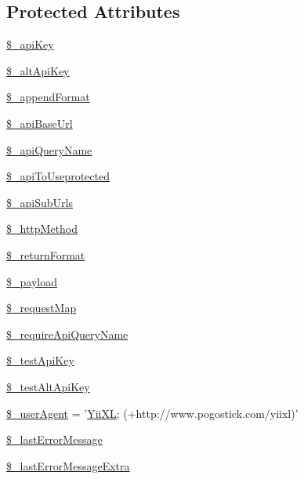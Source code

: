 \subsection*{Protected Attributes}
\begin{DoxyCompactItemize}
\item 
\hyperlink{classCXLApiComponent_a30d859488ed1921f08a7e8191363d9a4}{\$\_\-apiKey}
\item 
\hyperlink{classCXLApiComponent_a3bb30fd55481cc30ef96aa61d1b523b6}{\$\_\-altApiKey}
\item 
\hyperlink{classCXLApiComponent_ae027f791b6a2fc198dfabc3e2693f585}{\$\_\-appendFormat}
\item 
\hyperlink{classCXLApiComponent_a2a3098653897c46b33497dd90b807f64}{\$\_\-apiBaseUrl}
\item 
\hyperlink{classCXLApiComponent_adb92b727d9e245493a2001eca37693de}{\$\_\-apiQueryName}
\item 
\hyperlink{classCXLApiComponent_abdfb5848bea7acb66e39972358f344a8}{\$\_\-apiToUseprotected}
\item 
\hyperlink{classCXLApiComponent_aee5e6cb1a983f0bd5f57cefdd5a97241}{\$\_\-apiSubUrls}
\item 
\hyperlink{classCXLApiComponent_a1fa7e8f053c645c627f16bcf41f2416a}{\$\_\-httpMethod}
\item 
\hyperlink{classCXLApiComponent_a7ea52a3850e51717b6268b7b9e468684}{\$\_\-returnFormat}
\item 
\hyperlink{classCXLApiComponent_a01bc135256923b2605138f01e3f81d76}{\$\_\-payload}
\item 
\hyperlink{classCXLApiComponent_ae2824a887a5fbea2092a494eac8471bb}{\$\_\-requestMap}
\item 
\hyperlink{classCXLApiComponent_ab068ac6d8ffe672d108a88b51f766294}{\$\_\-requireApiQueryName}
\item 
\hyperlink{classCXLApiComponent_a539fd69c22d2f9c368e410d3542cd5a6}{\$\_\-testApiKey}
\item 
\hyperlink{classCXLApiComponent_a043b72271c216d07a270d5b57a17fe59}{\$\_\-testAltApiKey}
\item 
\hyperlink{classCXLApiComponent_a901ed68c5b7f6b758cc90b00197ca88b}{\$\_\-userAgent} = '\hyperlink{classYiiXL}{YiiXL}; (+http://www.pogostick.com/yiixl)'
\item 
\hyperlink{classCXLApiComponent_a204d1af51663d8a1317949e796fe5fca}{\$\_\-lastErrorMessage}
\item 
\hyperlink{classCXLApiComponent_a15913094186791f856e0e5eb23883ba3}{\$\_\-lastErrorMessageExtra}

\end{DoxyCompactItemize}
